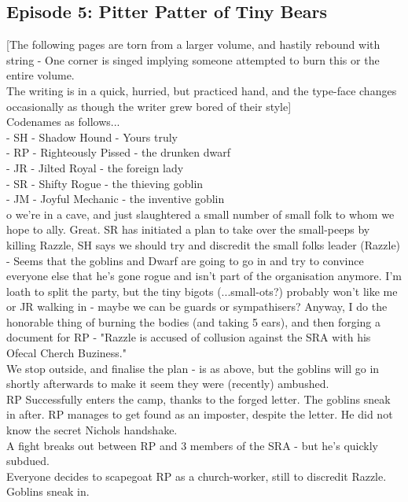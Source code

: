\subsection{Episode 5: Pitter Patter of Tiny Bears}

[The following pages are torn from a larger volume, and hastily rebound with string - One corner is singed implying someone attempted to burn this or the entire volume.\\
The writing is in a quick, hurried, but practiced hand, and the type-face changes occasionally as though the writer grew bored of their style]\\
Codenames as follows...\\
- SH - Shadow Hound - Yours truly\\
- RP - Righteously Pissed - the drunken dwarf\\
- JR - Jilted Royal - the foreign lady\\
- SR - Shifty Rogue - the thieving goblin\\
- JM - Joyful Mechanic - the inventive goblin\\
o we’re in a cave, and just slaughtered a small number of small folk to whom we hope to ally. Great.
SR has initiated a plan to take over the small-peeps by killing Razzle, SH says we should try and discredit the small folks leader (Razzle) - Seems that the goblins and Dwarf are going to go in and try to convince everyone else that he’s gone rogue and isn’t part of the organisation anymore.\medskip
I’m loath to split the party, but the tiny bigots (...small-ots?) probably won’t like me or JR walking in - maybe we can be guards or sympathisers?\medskip
Anyway, I do the honorable thing of burning the bodies (and taking 5 ears), and then forging a document for RP -
"Razzle is accused of collusion against the SRA with his Ofecal Cherch Buziness."\\
We stop outside, and finalise the plan - is as above, but the goblins will go in shortly afterwards to make it seem they were (recently) ambushed.\\
RP Successfully enters the camp, thanks to the forged letter. The goblins sneak in after. RP manages to get found as an imposter, despite the letter. He did not know the secret Nichols handshake.\\
A fight breaks out between RP and 3 members of the SRA - but he’s quickly subdued.\\
Everyone decides to scapegoat RP as a church-worker, still to discredit Razzle. Goblins sneak in.\\
